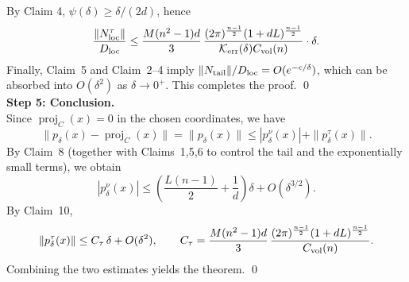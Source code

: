 \documentclass[11pt]{amsart}
\newcommand{\1}{\mathds{1}}
\theoremstyle{definition}
\theoremstyle{remark}
\theoremstyle{definition}
\begin{document}
By Claim 4, $\psi(\delta)\geq \delta/(2d)$, hence
\[
\frac{\|N_{\rm loc}^\tau\|}{D_{\rm loc}}
\le
\frac{M(n^2-1)d}{3}\,
\frac{(2\pi)^{\frac{n-1}{2}}(1+dL)^{\frac{n-1}{2}}}{\mathcal K_{\rm err}(\delta)C_{\rm vol}(n)}
\cdot \delta.
\]
Finally, Claim~5 and Claim~2--4 imply $\|N_{\rm tail}\|/D_{\rm loc}=O(e^{-c/\delta})$, which can be absorbed into
$O(\delta^2)$ as $\delta\to 0^+$. This completes the proof. \qed\\
\noindent\textbf{Step 5: Conclusion.}\\
Since $\operatorname{proj}_C(x)=0$ in the chosen coordinates, we have
\[
\|p_\delta(x)-\operatorname{proj}_C(x)\|=\|p_\delta(x)\|\le |p_\delta^\nu(x)|+\|p_\delta^\tau(x)\|.
\]
By Claim~8 (together with Claims~1,5,6 to control the tail and the exponentially small terms), we obtain
\[
|p_\delta^\nu(x)|\le \left(\frac{L(n-1)}{2}+\frac{1}{d}\right)\delta+O(\delta^{3/2}).
\]
By Claim~10,
\[
\|p_\delta^\tau(x)\|\le C_\tau\,\delta+O(\delta^2),
\qquad
C_\tau=\frac{M(n^2-1)d}{3}\,
\frac{(2\pi)^{\frac{n-1}{2}}(1+dL)^{\frac{n-1}{2}}}{C_{\rm vol}(n)}.
\]
Combining the two estimates yields the theorem. \qed






\end{document}
